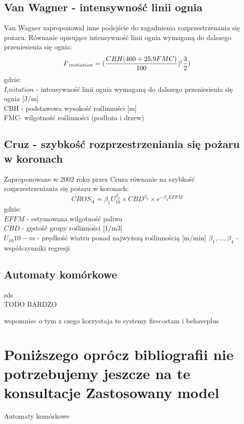 \documentclass[a4paper, 11pt]{article}
\begin{document}
\subsection{Van Wagner - intensywność linii ognia}
\indent
Van Wagner zaproponował inne podejście do zagadnienia rozprzestrzenania się pożaru. Równanie opisujące intensywność linii ognia wymaganą do dalszego przeniesienia się ognia:
$$
I`_{initiation}=(\frac{CBH(460+25.9FMC)}{100})^(\frac{3}{2})
$$
gdzie:\\
$I_initation$ - intensywność linii ognia wymaganą do dalszego przeniesienia się ognia [J/m] \\
CBH - podstawowa wysokość roślinności [m]\\
FMC- wilgotność roślinności (podłoża i drzew)\\
\iffalse
\subsection{Cruz(1999)}
$$
g(x)=\beta_0+\beta_{1}U_10+\beta_{2}FSG+ \sum\limits_{a=1}^{k_j -1}\beta_{ju}D_{ju}+\beta_5EFFM
$$
EFFM- estimated fine ful moisture content(\% ovendry mass basis)\\
$U_10  10-m$ open wind speed
$\beta_1, ...,\beta_4$ -regression coefficients
\fi
\subsection{Cruz - szybkość rozprzestrzeniania się pożaru w koronach}
\indent
Zaproponowane w 2002 roku przez Cruza równanie na szybkość rozprzestrzeniania się pożaru w koronach: 
$$
CROS_A=\beta_1U^{\beta_2}_10 \times CBD^{\beta_3} \times e^{-\beta_4EFFM}
$$
gdzie: \\
$EFFM$ - estymowana wilgotność paliwa \\
$CBD$ - gęstość grupy roślinności [1/m3]\\
$U_10  10-m$ - prędkość wiatru ponad najwyższą roślinnością [m/min]
$\beta_1, ...,\beta_4$ -współczynniki regresji\\
\subsection{Automaty komórkowe}	
\indent
sds
\\TODO BARDZO

	wspomniec o tym z czego korzystaja te systemy firecostam i behaveplus
	
	
	
	\section{Poniższego oprócz bibliografii nie potrzebujemy jeszcze na te konsultacje  Zastosowany model}
	\indent
Automaty komórkowe
		
\end{document}
